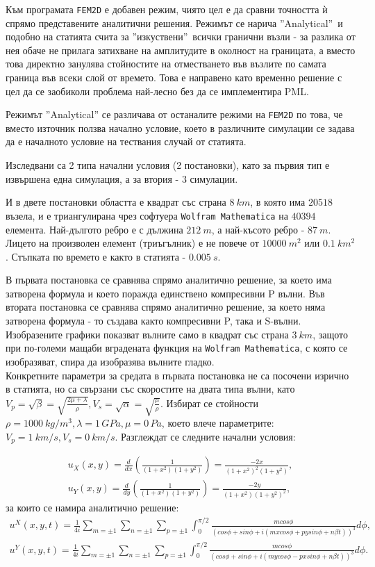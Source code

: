 \documentclass{report}
\begin{document}
	Към програмата \texttt{FEM2D} е добавен режим, чиято цел е да сравни точността ѝ спрямо представените аналитични решения. Режимът се нарича ''Analytical''\ и подобно на статията счита за ''изкуствени''\ всички гранични възли - за разлика от нея обаче не прилага затихване на амплитудите в околност на границата, а вместо това директно занулява стойностите на отместването във възлите по самата граница във всеки слой от времето. Това е направено като временно решение с цел да се заобиколи проблема най-лесно без да се имплементира PML.
	
	Режимът ''Analytical'' се различава от останалите режими на \texttt{FEM2D} по това, че вместо източник ползва начално условие, което в различните симулации се задава да е началното условие на тествания случай от статията.
	
	Изследвани са 2 типа начални условия (2 постановки), като за първия тип е извършена една симулация, а за втория - 3 симулации.
	
	И в двете постановки областта е квадрат със страна $8~km$, в която има $20518$ възела, и е триангулирана чрез софтуера \texttt{Wolfram Mathematica} на $40394$ елемента. Най-дългото ребро е с дължина $212~ m$, а най-късото ребро - $87~m$. Лицето на произволен елемент (триъгълник) е не повече от $10000~m^2$ или $0.1~km^2$. Стъпката по времето е както в статията - $0.005~s$.
	
	В първата постановка се сравнява спрямо аналитично решение, за което има затворена формула и което поражда единствено компресивни P вълни. Във втората постановка се сравнява спрямо аналитично решение, за което няма затворена формула - то създава както компресивни P, така и S-вълни. Изобразените графики показват вълните само в квадрат със страна $3~km$, защото при по-големи мащаби вградената функция на \texttt{Wolfram Mathematica}, с която се изобразяват, спира да изобразява вълните гладко. 
	\\Конкретните параметри за средата в първата постановка не са посочени изрично в статията, но са свързани със скоростите на двата типа вълни, като $V_p=\sqrt{\beta}=\sqrt{\frac{2\mu+\lambda}{\rho}}, V_s=\sqrt{\alpha}=\sqrt{\frac{\mu}{\rho}}$. Избират се стойности $ \rho=1000~kg/m^3, \lambda=1\,GPa, \mu=0\,Pa$, което влече параметрите: $V_p=1~km/s, V_s=0~km/s$. Разглеждат се следните начални условия:
	
	\begin{align}
		u_X(x,y) = \frac{d}{dx}\left(\frac{1}{(1+x^2)(1+y^2)}\right)=\frac{-2x}{(1+x^2)^2(1+y^2)},\\
		u_Y(x,y) = \frac{d}{dy}\left(\frac{1}{(1+x^2)(1+y^2)}\right)=\frac{-2y}{(1+x^2)(1+y^2)^2},
	\end{align}
	за които се намира аналитично решение:
	\begin{align*}
		u^X(x,y,t)=\frac{1}{4i}\sum_{m=\pm1}\sum_{n=\pm1}\sum_{p=\pm1}\int_0^{\pi/2}\frac{mcos\phi}{(cos\phi+sin\phi+i(mx cos\phi+py sin\phi+n\beta t))^3}d\phi,\\
		u^Y(x,y,t)=\frac{1}{4i}\sum_{m=\pm1}\sum_{n=\pm1}\sum_{p=\pm1}\int_0^{\pi/2}\frac{mcos\phi}{(cos\phi+sin\phi+i(my cos\phi-px sin\phi+n\beta t))^3}d\phi.
	\end{align*}
	
\end{document}

